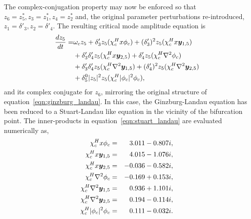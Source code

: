 The complex-conjugation property may now be enforced so that $z_{6}=z^{*}_{5}, z_{3}=z^{*}_{1}, z_{4}=z^{*}_{2}$ and, the original parameter perturbations re-introduced, $z_{1} = \delta'_{3}, z_{2} = \delta'_{4}$. The resulting critical mode amplitude equation is
\begin{align}
	\label{eqn:stuart_landau}
	\begin{split}
	\dfrac{d z_{5}}{d t} =
	& \omega_{c}z_{5} + \delta'_{3}z_{5}(\chi^{H}_{c}x\phi_{c}) +  				(\delta'_{3})^{2}z_{5}(\chi^{H}_{c}x\boldsymbol{y}_{1,5}) \\
	& + \delta'_{3}\delta'_{4}z_{5}(\chi^{H}_{c}x\boldsymbol{y}_{2,5}) + \delta'_{4}z_{5}(\chi^{H}_{c}\nabla^{2}\phi_{c}) \\
	&  + \delta'_{3}\delta'_{4}z_{5}(\chi^{H}_{c}\nabla^{2}\boldsymbol{y}_{1,5}) + (\delta'_{4})^{2}z_{5}(\chi^{H}_{c}\nabla^{2}\boldsymbol{y}_{2,5}) \\
	& + \delta^{0}_{5}|z_{5}|^{2}z_{5}(\chi^{H}_{c}|\phi_{c}|^{2}\phi_{c}),
	\end{split} 
\end{align}
and its complex conjugate for $z_{6}$, mirroring the original structure of equation~\eqref{eqn:ginzburg_landau}. In this case, the Ginzburg-Landau equation has been reduced to a Stuart-Landau like equation in the vicinity of the bifurcation point. The inner-products in equation~\eqref{eqn:stuart_landau} are evaluated numerically as,
\begin{align}
	\chi^{H}_{c}x\phi_{c} =&& 3.011 - 0.807i, \nonumber\\
	\chi^{H}_{c}x\boldsymbol{y}_{1,5} =&& 4.015 - 1.076i, \nonumber \\
	\chi^{H}_{c}x\boldsymbol{y}_{2,5} =&& -0.036 - 0.582i,  \nonumber \\
	\chi^{H}_{c}\nabla^{2}\phi_{c} =&& -0.169 + 0.153i, \nonumber \\
	\chi^{H}_{c}\nabla^{2}\boldsymbol{y}_{1,5} =&& 0.936 + 1.101i, \nonumber \\
	\chi^{H}_{c}\nabla^{2}\boldsymbol{y}_{2,5} =&& 0.194 - 0.114i, \nonumber \\
	\chi^{H}_{c}|\phi_{c}|^{2}\phi_{c} =&& 0.111 - 0.032i. \nonumber
\end{align}

